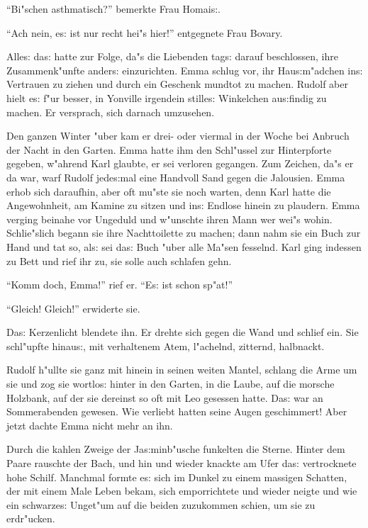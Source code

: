 \documentclass[oneside,12pt]{book}
\newcommand{\s}{s:}%
\begin{document}
"`Bi"schen asthmatisch?"' bemerkte Frau Homai{\s}.

"`Ach nein, e{\s} ist nur recht hei"s hier!"' entgegnete Frau
Bovary.

Alle{\s} da{\s} hatte zur Folge, da"s die Liebenden tag{\s} darauf
beschlossen, ihre Zusammenk"unfte ander{\s} einzurichten. Emma
schlug vor, ihr Hau{\s}m"adchen in{\s} Vertrauen zu ziehen und
durch ein Geschenk mundtot zu machen. Rudolf aber hielt e{\s} f"ur
besser, in Yonville irgendein stille{\s} Winkelchen au{\s}findig
zu machen. Er versprach, sich darnach umzusehen.

Den ganzen Winter "uber kam er drei- oder viermal in der Woche bei
Anbruch der Nacht in den Garten. Emma hatte ihm den Schl"ussel zur
Hinterpforte gegeben, w"ahrend Karl glaubte, er sei verloren
gegangen. Zum Zeichen, da"s er da war, warf Rudolf jede{\s}mal
eine Handvoll Sand gegen die Jalousien. Emma erhob sich daraufhin,
aber oft mu"ste sie noch warten, denn Karl hatte die Angewohnheit,
am Kamine zu sitzen und in{\s} Endlose hinein zu plaudern. Emma
verging beinahe vor Ungeduld und w"unschte ihren Mann wer wei"s
wohin. Schlie"slich begann sie ihre Nachttoilette zu machen; dann
nahm sie ein Buch zur Hand und tat so, al{\s} sei da{\s} Buch
"uber alle Ma"sen fesselnd. Karl ging indessen zu Bett und rief
ihr zu, sie solle auch schlafen gehn.

"`Komm doch, Emma!"' rief er. "`E{\s} ist schon sp"at!"'

"`Gleich! Gleich!"' erwiderte sie.

Da{\s} Kerzenlicht blendete ihn. Er drehte sich gegen die Wand und
schlief ein. Sie schl"upfte hinau{\s}, mit verhaltenem Atem,
l"achelnd, zitternd, halbnackt.

Rudolf h"ullte sie ganz mit hinein in seinen weiten Mantel,
schlang die Arme um sie und zog sie wortlo{\s} hinter in den
Garten, in die Laube, auf die morsche Holzbank, auf der sie
dereinst so oft mit Leo gesessen hatte. Da{\s} war an
Sommerabenden gewesen. Wie verliebt hatten seine Augen
geschimmert! Aber jetzt dachte Emma nicht mehr an ihn.

Durch die kahlen Zweige der Ja{\s}minb"usche funkelten die Sterne.
Hinter dem Paare rauschte der Bach, und hin und wieder knackte am
Ufer da{\s} vertrocknete hohe Schilf. Manchmal formte e{\s} sich
im Dunkel zu einem massigen Schatten, der mit einem Male Leben
bekam, sich emporrichtete und wieder neigte und wie ein
schwarze{\s} Unget"um auf die beiden zuzukommen schien, um sie zu
erdr"ucken.
\end{document}
